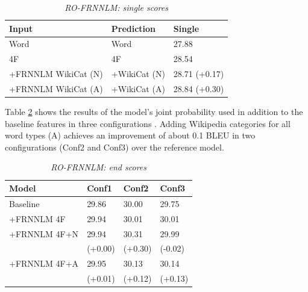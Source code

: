 \documentclass[a4paper]{article}
\begin{document}

\begin{table}
\caption{\it RO-FRNNLM: single scores}
\vspace{2mm}
\centering
  \begin{tabular}{lll}
  	\hline
  	Input               & Prediction   & Single        \\ \hline\hline
  	Word                & Word         & 27.88         \\
  	4F                  & 4F           & 28.54         \\ \hline
  	+FRNNLM WikiCat (N) & +WikiCat (N) & 28.71 (+0.17) \\
  	+FRNNLM WikiCat (A) & +WikiCat (A) & 28.84 (+0.30)
  \end{tabular}
  \label{tb:ro-factored-single}
\end{table}

Table \ref{tb:ro-factored-combi} shows the results of the model's joint probability used in addition to the baseline features in three configurations \cite{niehuesusing}. 
Adding Wikipedia categories for all word types (A) achieves an improvement of about 0.1 BLEU in two configurations (Conf2 and Conf3) over the reference model.


\begin{table}
\caption{\it RO-FRNNLM: end scores}
\vspace{2mm}
\centering
  \begin{tabular}{llll}
  	\hline
  	Model        & Conf1   & Conf2   & Conf3   \\ \hline\hline
  	Baseline     & 29.86   & 30.00   & 29.75   \\
  	+FRNNLM 4F   & 29.94   & 30.01   & 30.01   \\ \hline
  	+FRNNLM 4F+N & 29.94   & 30.31   & 29.99   \\
  	             & (+0.00) & (+0.30) & (-0.02) \\
  	+FRNNLM 4F+A & 29.95   & 30.13   & 30.14   \\
  	             & (+0.01) & (+0.12) & (+0.13)
  \end{tabular}
  \label{tb:ro-factored-combi}
\end{table}
\end{document}
